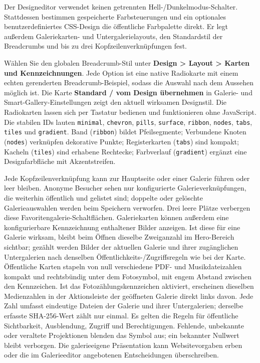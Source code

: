\documentclass[11pt,a4paper]{article}
\newcommand{\ui}[1]{\textbf{#1}}
\newcommand{\codeword}[1]{\nolinkurl{#1}}
\begin{document}
Der Designeditor verwendet keinen getrennten Hell-/Dunkelmodus-Schalter.
Stattdessen bestimmen gespeicherte Farbsteuerungen und ein optionales
benutzerdefiniertes CSS-Design die öffentliche Farbpalette direkt. Er legt
außerdem Galeriekarten- und Untergalerielayouts, den Standardstil der
Breadcrumbs und bis zu drei Kopfzeilenverknüpfungen fest.

Wählen Sie den globalen Breadcrumb-Stil unter \ui{Design > Layout > Karten und
Kennzeichnungen}. Jede Option ist eine native Radiokarte mit einem echten
gerenderten Breadcrumb-Beispiel, sodass die Auswahl nach dem Aussehen möglich
ist. Die Karte \ui{Standard / vom Design übernehmen} in Galerie- und
Smart-Gallery-Einstellungen zeigt den aktuell wirksamen Designstil. Die
Radiokarten lassen sich per Tastatur bedienen und funktionieren ohne JavaScript.
Die stabilen IDs lauten \codeword{minimal}, \codeword{chevron},
\codeword{pills}, \codeword{surface}, \codeword{ribbon}, \codeword{nodes},
\codeword{tabs}, \codeword{tiles} und \codeword{gradient}. Band
(\codeword{ribbon}) bildet Pfeilsegmente; Verbundene Knoten (\codeword{nodes})
verknüpfen dekorative Punkte; Registerkarten (\codeword{tabs}) sind kompakt;
Kacheln (\codeword{tiles}) sind erhabene Rechtecke; Farbverlauf
(\codeword{gradient}) ergänzt eine Designfarbfläche mit Akzentstreifen.

Jede Kopfzeilenverknüpfung kann zur Hauptseite oder einer Galerie führen oder
leer bleiben. Anonyme Besucher sehen nur konfigurierte Galerieverknüpfungen, die
weiterhin öffentlich und gelistet sind; doppelte oder gelöschte Galerieauswahlen
werden beim Speichern verworfen. Drei leere Plätze verbergen diese
Favoritengalerie-Schaltflächen. Galeriekarten können außerdem eine
konfigurierbare Kennzeichnung enthaltener Bilder anzeigen. Ist diese für eine
Galerie wirksam, bleibt beim Öffnen dieselbe Zweiganzahl im Hero-Bereich
sichtbar; gezählt werden Bilder der aktuellen Galerie und ihrer zugänglichen
Untergalerien nach denselben Öffentlichkeits-/Zugriffsregeln wie bei der Karte.
Öffentliche Karten stapeln von null verschiedene PDF- und Musikdateizahlen
kompakt und rechtsbündig unter dem Fotosymbol, mit engem Abstand zwischen den
Kennzeichen. Ist das Fotozählungskennzeichen aktiviert, erscheinen dieselben
Medienzahlen in der Aktionsleiste der geöffneten Galerie direkt links davon.
Jede Zahl umfasst eindeutige Dateien der Galerie und ihrer Untergalerien;
derselbe erfasste SHA-256-Wert zählt nur einmal. Es gelten die Regeln für
öffentliche Sichtbarkeit, Ausblendung, Zugriff und Berechtigungen. Fehlende,
unbekannte oder veraltete Projektionen blenden das Symbol aus; ein bekannter
Nullwert bleibt verborgen. Die galerieeigene Präsentation kann Websitevorgaben
erben oder die im Galerieeditor angebotenen Entscheidungen überschreiben.
\end{document}
